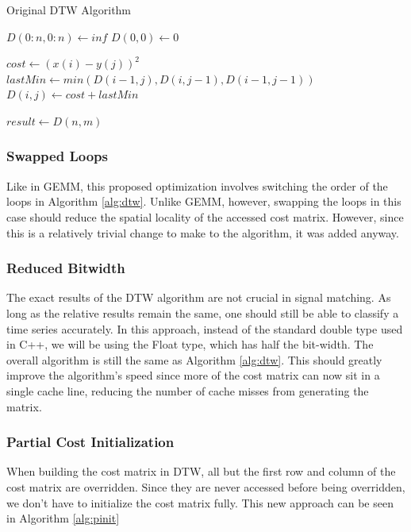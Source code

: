 \documentclass[sigconf,authordraft]{acmart}
\begin{document}
\begin{algorithm}
\caption{Original DTW Algorithm}\label{alg:dtw}
\begin{algorithmic}

\State $D(0:n, 0:n) \gets inf$
\State $D(0, 0) \gets 0$

        \State $cost \gets (x(i) - y(j))^2$
        \State $lastMin \gets min(D(i-1,j), D(i,j-1),D(i-1,j-1))$
        \State $D(i,j) \gets cost + lastMin$
    \EndFor
\EndFor

\State $result \gets D(n,m)$
\end{algorithmic}
\end{algorithm}

\subsubsection{Swapped Loops}
Like in GEMM, this proposed optimization involves switching the order of the loops in Algorithm \ref{alg:dtw}. Unlike GEMM, however, swapping the loops in this case should reduce the spatial locality of the accessed cost matrix. However, since this is a relatively trivial change to make to the algorithm, it was added anyway.

\subsubsection{Reduced Bitwidth}
The exact results of the DTW algorithm are not crucial in signal matching. As long as the relative results remain the same, one should still be able to classify a time series accurately. In this approach, instead of the standard double type used in C++, we will be using the Float type, which has half the bit-width. The overall algorithm is still the same as Algorithm \ref{alg:dtw}. This should greatly improve the algorithm's speed since more of the cost matrix can now sit in a single cache line, reducing the number of cache misses from generating the matrix.

\subsubsection{Partial Cost Initialization}
When building the cost matrix in DTW, all but the first row and column of the cost matrix are overridden. Since they are never accessed before being overridden, we don't have to initialize the cost matrix fully. This new approach can be seen in Algorithm \ref{alg:pinit}
\end{document}
